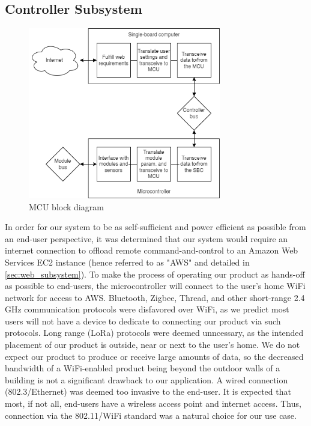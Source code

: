 \subsection{Controller Subsystem}
\label{sec:controller_subsystem}
\begin{figure}[H]
    \label{mcu_block_diagram}
    \caption{MCU block diagram}
    \centering
    \includegraphics[width=0.75\textwidth]{images/mcu_block_diagram.png}
\end{figure}
\begin{flushleft}
    In order for our system to be as self-sufficient and power efficient as
    possible from an end-user perspective, it was determined that our system
    would require an internet connection to offload remote command-and-control
    to an Amazon Web Services EC2 instance (hence referred to as "AWS" and detailed in
    \autoref{sec:web_subsystem}). To make the process of operating our product 
    as hands-off as possible to end-users, the microcontroller will connect to
    the user's home WiFi network for access to AWS. Bluetooth, Zigbee, Thread,
    and other short-range 2.4 GHz communication protocols were disfavored over
    WiFi, as we predict most users will not have a device to dedicate to
    connecting our product via such protocols. Long range (LoRa) protocols were
    deemed unncessary, as the intended placement of our product is outside, 
    near or next to the user's home. We do not expect our product to produce
    or receive large amounts of data, so the decreased bandwidth of a
    WiFi-enabled product being beyond the outdoor walls of a building
    is not a significant drawback to our application. A wired connection
    (802.3/Ethernet) was deemed too invasive to the end-user. It is expected
    that most, if not all, end-users have a wireless access point and internet
    access. Thus, connection via the 802.11/WiFi standard was a natural choice
    for our use case.
\end{flushleft}
